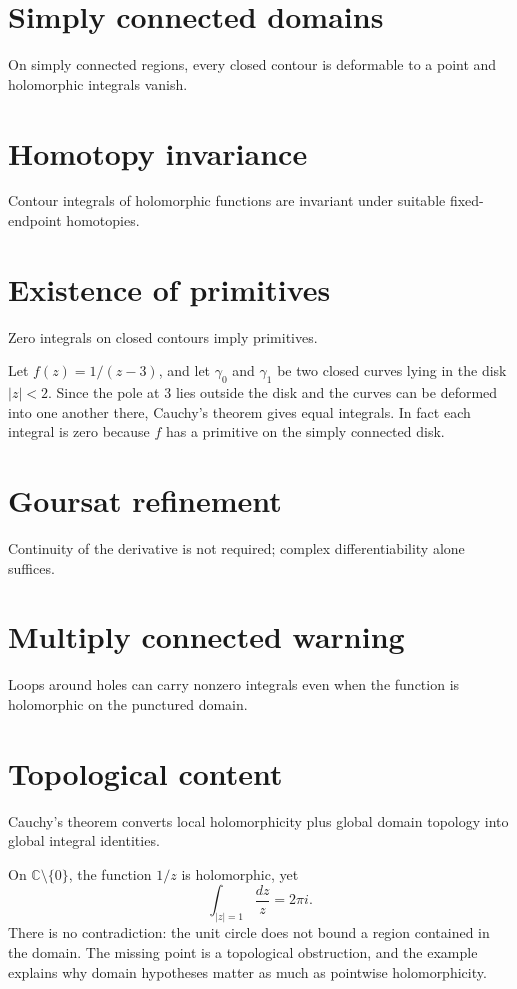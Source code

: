 \section{Simply connected domains}
On simply connected regions, every closed contour is deformable to a point and holomorphic integrals vanish.

\section{Homotopy invariance}
Contour integrals of holomorphic functions are invariant under suitable fixed-endpoint homotopies.

\section{Existence of primitives}
Zero integrals on closed contours imply primitives.

\begin{example}\label{ex:iv05-expand-02}
Let \(f(z)=1/(z-3)\), and let \(\gamma_0\) and \(\gamma_1\) be two closed curves lying in the disk \(|z|<2\). Since the pole at \(3\) lies outside the disk and the curves can be deformed into one another there, Cauchy's theorem gives equal integrals. In fact each integral is zero because \(f\) has a primitive on the simply connected disk.
\end{example}
\section{Goursat refinement}
Continuity of the derivative is not required; complex differentiability alone suffices.

\section{Multiply connected warning}
Loops around holes can carry nonzero integrals even when the function is holomorphic on the punctured domain.

\section{Topological content}
Cauchy's theorem converts local holomorphicity plus global domain topology into global integral identities.

\begin{example}\label{ex:iv05-expand-03}
On \(\mathbb C\setminus\{0\}\), the function \(1/z\) is holomorphic, yet
\[
\int_{|z|=1}\frac{dz}{z}=2\pi i.
\]
There is no contradiction: the unit circle does not bound a region contained in the domain. The missing point is a topological obstruction, and the example explains why domain hypotheses matter as much as pointwise holomorphicity.
\end{example}
